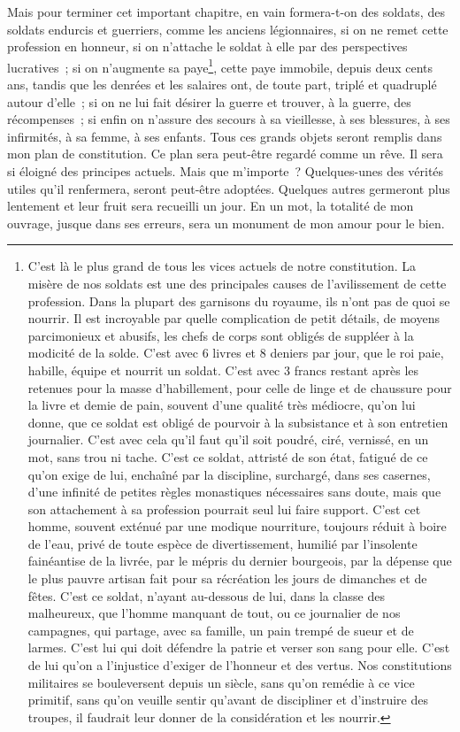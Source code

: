 \documentclass[french,twoside]{book} %
\begin{document}
Mais pour terminer cet important chapitre, en vain formera-t-on des soldats, des soldats endurcis et guerriers, comme les anciens légionnaires, si on ne remet cette profession en honneur, si on n’attache le soldat à elle par des perspectives lucratives ; si on n’augmente sa paye\footnote{C’est là le plus grand de tous les vices actuels de notre constitution. La misère de nos soldats est une des principales causes de l’avilissement de cette profession. Dans la plupart des garnisons du royaume, ils n’ont pas de quoi se nourrir. Il est incroyable par quelle complication de petit détails, de moyens parcimonieux et abusifs, les chefs de corps sont obligés de suppléer à la modicité de la solde. C’est avec 6 livres et 8 deniers par jour, que le roi paie, habille, équipe et nourrit un soldat. C’est avec 3 francs restant après les retenues pour la masse d’habillement, pour celle de linge et de chaussure pour la livre et demie de pain, souvent d’une qualité très médiocre, qu’on lui donne, que ce soldat est obligé de pourvoir à la subsistance et à son entretien journalier. C’est avec cela qu’il faut qu’il soit poudré, ciré, vernissé, en un mot, sans trou ni tache. C’est ce soldat, attristé de son état, fatigué de ce qu’on exige de lui, enchaîné par la discipline, surchargé, dans ses casernes, d’une infinité de petites règles monastiques nécessaires sans doute, mais que son attachement à sa profession pourrait seul lui faire support. C’est cet homme, souvent exténué par une modique nourriture, toujours réduit à boire de l’eau, privé de toute espèce de divertissement, humilié par l’insolente fainéantise de la livrée, par le mépris du dernier bourgeois, par la dépense que le plus pauvre artisan fait pour sa récréation les jours de dimanches et de fêtes. C’est ce soldat, n’ayant au-dessous de lui, dans la classe des malheureux, que l’homme manquant de tout, ou ce journalier de nos campagnes, qui partage, avec sa famille, un pain trempé de sueur et de larmes. C’est lui qui doit défendre la patrie et verser son sang pour elle. C’est de lui qu’on a l’injustice d’exiger de l’honneur et des vertus. Nos constitutions militaires se bouleversent depuis un siècle, sans qu’on remédie à ce vice primitif, sans qu’on veuille sentir qu’avant de discipliner et d’instruire des troupes, il faudrait leur donner de la considération et les nourrir.}, cette paye immobile, depuis deux cents ans, tandis que les denrées et les salaires ont, de toute part, triplé et quadruplé autour d’elle ; si on ne lui fait désirer la guerre et trouver, à la guerre, des récompenses ; si enfin on n’assure des secours à sa vieillesse, à ses blessures, à ses infirmités, à sa femme, à ses enfants. Tous ces grands objets seront remplis dans mon plan de constitution. Ce plan sera peut-être regardé comme un rêve. Il sera si éloigné des principes actuels. Mais que m’importe ? Quelques-unes des vérités utiles qu’il renfermera, seront peut-être adoptées. Quelques autres germeront plus lentement et leur fruit sera recueilli un jour. En un mot, la totalité de mon ouvrage, jusque dans ses erreurs, sera un monument de mon amour pour le bien.
\end{document}
